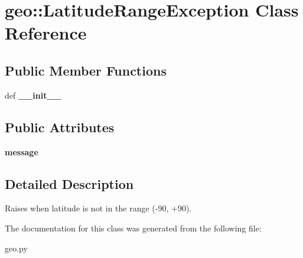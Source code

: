 \hypertarget{classgeo_1_1LatitudeRangeException}{
\section{geo::LatitudeRangeException Class Reference}
\label{classgeo_1_1LatitudeRangeException}
}
\subsection*{Public Member Functions}
\begin{DoxyCompactItemize}
\item 
\hypertarget{classgeo_1_1LatitudeRangeException_ad0d86e5bda7b99607ef9ec0e212e3c4b}{
def {\bfseries \_\-\_\-init\_\-\_\-}}
\label{classgeo_1_1LatitudeRangeException_ad0d86e5bda7b99607ef9ec0e212e3c4b}

\end{DoxyCompactItemize}
\subsection*{Public Attributes}
\begin{DoxyCompactItemize}
\item 
\hypertarget{classgeo_1_1LatitudeRangeException_a7cd1b893bd08b7d7c5aceab9741810d2}{
{\bfseries message}}
\label{classgeo_1_1LatitudeRangeException_a7cd1b893bd08b7d7c5aceab9741810d2}

\end{DoxyCompactItemize}


\subsection{Detailed Description}
\begin{DoxyVerb}Raises when latitude is not in the range (-90, +90).\end{DoxyVerb}
 

The documentation for this class was generated from the following file:\begin{DoxyCompactItemize}
\item 
geo.py\end{DoxyCompactItemize}
